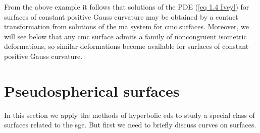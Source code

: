 From the above example it follows that solutions of the PDE (\ref{eq 1.4 Ivey}) for surfaces of constant positive Gauss curvature may be obtained by a contact transformation from solutions of the \gls{ma} system for \gls{cmc} surfaces. Moreover, we will see below that any \gls{cmc} surface admits a family of noncongruent isometric deformations, so similar deformations become available for surfaces of constant positive Gauss curvature.








\section{Pseudospherical surfaces}\label{sec: pseudospherical surfaces}

In this section we apply the methods of hyperbolic \gls{eds} to study a special class of surfaces related to the \gls{sge}. But first we need to briefly discuss curves on surfaces.

